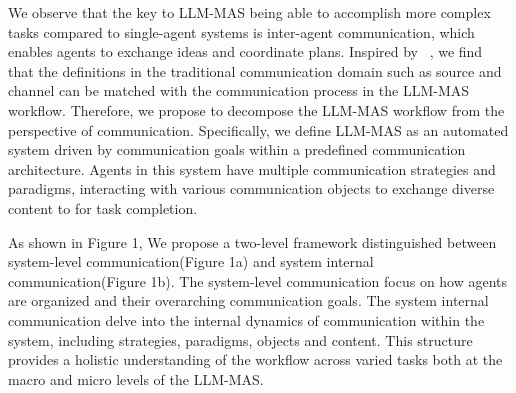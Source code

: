 
We observe that the key to LLM-MAS being able to accomplish more complex tasks compared to single-agent systems is inter-agent communication, which enables agents to exchange ideas and coordinate plans. Inspired by ~\cite{communication_1,communication_2}, we find that the definitions in the traditional communication domain such as source and channel can be matched with the communication process in the LLM-MAS workflow. Therefore, we propose to decompose the LLM-MAS workflow from the perspective of communication. Specifically, we define LLM-MAS as an automated system driven by communication goals within a predefined communication architecture. Agents in this system have multiple communication strategies and paradigms, interacting with various communication objects to exchange diverse content to for task completion.

As shown in Figure 1, We propose a two-level framework distinguished between system-level communication(Figure 1a) and system internal communication(Figure 1b). The system-level communication focus on how agents are organized and their overarching communication goals. The system internal communication delve into the internal dynamics of communication within the system, including strategies, paradigms, objects and content. This structure provides a holistic understanding of the workflow across varied tasks both at the macro and micro levels of the LLM-MAS.

